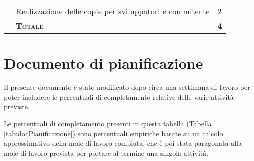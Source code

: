 \begin{tabularx}{\textwidth}{|m{5cm}|X|M{2cm}|}
	                                                                          & Realizzazione delle copie per sviluppatori e commitente        & 2                                                        \\  
	                                  & \textbf{\textsc{Totale}}                                     & \textbf{4}                                               \\ \hline
\end{tabularx}

\section{Documento di pianificazione}
Il presente documento è stato modificato dopo circa una settimana di lavoro per
poter includere le percentuali di completamento relative delle varie attività
previste.

Le percentuali di completamento presenti in questa tabella (Tabella
\ref{tab:docPianificazione}) sono percentuali empiriche basate su un calcolo
approssimativo della mole di lavoro compiuta, che è poi stata paragonata alla
mole di lavoro prevista per portare al termine una singola attività.
 
